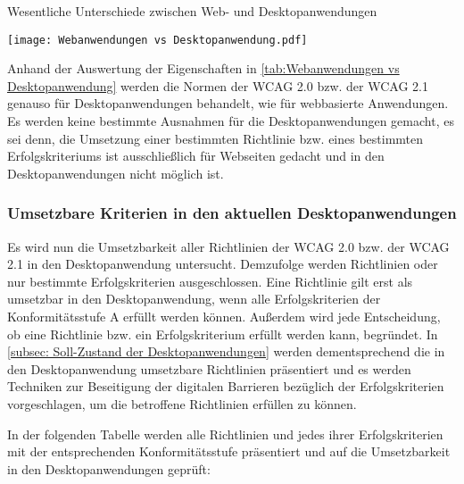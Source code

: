 \begin{table}[H]
	\caption{Wesentliche Unterschiede zwischen  Web- und Desktopanwendungen}
	\label{tab:Webanwendungen vs Desktopanwendung}
	\centering
	\texttt{[image: Webanwendungen vs Desktopanwendung.pdf]}
\end{table}

Anhand der Auswertung der Eigenschaften in \cref{tab:Webanwendungen vs Desktopanwendung} werden die Normen der \ac{WCAG} 2.0 bzw. der \ac{WCAG} 2.1 genauso für Desktopanwendungen behandelt, wie für webbasierte Anwendungen. Es werden keine bestimmte Ausnahmen für die Desktopanwendungen gemacht, es sei denn, die Umsetzung einer bestimmten Richtlinie bzw. eines bestimmten Erfolgskriteriums ist ausschließlich für Webseiten gedacht und in den Desktopanwendungen nicht möglich ist.

\subsubsection{Umsetzbare Kriterien in den aktuellen Desktopanwendungen}
\label{subsec: Umsetzbare Kriterien}

Es wird nun die Umsetzbarkeit aller Richtlinien der \ac{WCAG} 2.0 bzw. der \ac{WCAG} 2.1 in den Desktopanwendung untersucht. Demzufolge werden Richtlinien oder nur bestimmte Erfolgskriterien ausgeschlossen. Eine Richtlinie gilt erst als umsetzbar in den Desktopanwendung, wenn alle Erfolgskriterien der Konformitätsstufe A erfüllt werden können. Außerdem wird  jede Entscheidung, ob eine Richtlinie bzw. ein Erfolgskriterium erfüllt werden kann, begründet. In \cref{subsec: Soll-Zustand der Desktopanwendungen} werden dementsprechend die in den Desktopanwendung umsetzbare Richtlinien präsentiert und es werden Techniken zur Beseitigung der digitalen Barrieren bezüglich der Erfolgskriterien vorgeschlagen, um die betroffene Richtlinien erfüllen zu können.

In der folgenden Tabelle werden alle Richtlinien und jedes ihrer Erfolgskriterien mit der entsprechenden Konformitätsstufe präsentiert und auf die Umsetzbarkeit in den Desktopanwendungen geprüft:
\\



